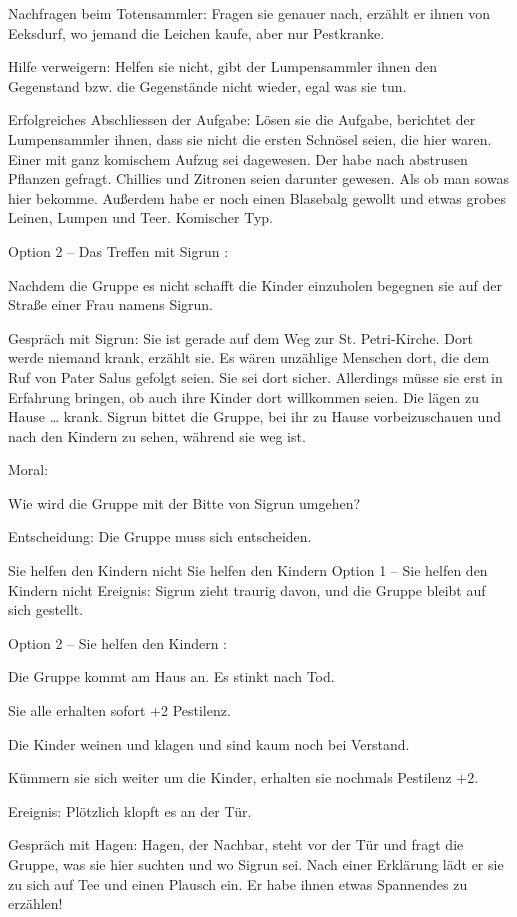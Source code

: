 Nachfragen beim Totensammler: Fragen sie genauer nach, erzählt er ihnen von Eeksdurf, wo jemand die Leichen kaufe, aber nur Pestkranke.

Hilfe verweigern: Helfen sie nicht, gibt der Lumpensammler ihnen den Gegenstand bzw. die Gegenstände nicht wieder, egal was sie tun.


Erfolgreiches Abschliessen der Aufgabe: Lösen sie die Aufgabe, berichtet der Lumpensammler ihnen, dass sie nicht die ersten Schnösel seien, die hier waren. Einer mit ganz komischem Aufzug sei dagewesen. Der habe nach abstrusen Pflanzen gefragt. Chillies und Zitronen seien darunter gewesen. Als ob man sowas hier bekomme. Außerdem habe er noch einen Blasebalg gewollt und etwas grobes Leinen, Lumpen und Teer. Komischer Typ.

Option 2 – Das Treffen mit Sigrun
:

Nachdem die Gruppe es nicht schafft die Kinder einzuholen begegnen sie auf der Straße einer Frau namens Sigrun.

Gespräch mit Sigrun: Sie ist gerade auf dem Weg zur St. Petri-Kirche. Dort werde niemand krank, erzählt sie. Es wären unzählige Menschen dort, die dem Ruf von Pater Salus gefolgt seien. Sie sei dort sicher. Allerdings müsse sie erst in Erfahrung bringen, ob auch ihre Kinder dort willkommen seien. Die lägen zu Hause … krank. Sigrun bittet die Gruppe, bei ihr zu Hause vorbeizuschauen und nach den Kindern zu sehen, während sie weg ist.

Moral:

Wie wird die Gruppe mit der Bitte von Sigrun umgehen?

Entscheidung: Die Gruppe muss sich entscheiden.

Sie helfen den Kindern nicht
Sie helfen den Kindern
Option 1 – Sie helfen den Kindern nicht
Ereignis: Sigrun zieht traurig davon, und die Gruppe bleibt auf sich gestellt.


Option 2 – Sie helfen den Kindern
:

Die Gruppe kommt am Haus an. Es stinkt nach Tod.

Sie alle erhalten sofort +2 Pestilenz.

Die Kinder weinen und klagen und sind kaum noch bei Verstand.

Kümmern sie sich weiter um die Kinder, erhalten sie nochmals Pestilenz +2.

Ereignis: Plötzlich klopft es an der Tür.

Gespräch mit Hagen: Hagen, der Nachbar, steht vor der Tür und fragt die Gruppe, was sie hier suchten und wo Sigrun sei. Nach einer Erklärung lädt er sie zu sich auf Tee und einen Plausch ein. Er habe ihnen etwas Spannendes zu erzählen!

